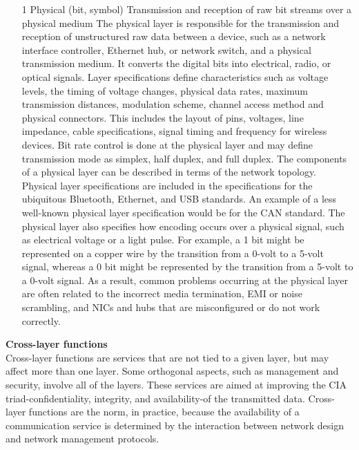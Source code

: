 \documentclass{article}
\begin{document}
\begin{enumerate}[label = \arabic*]
\item[1] Physical (bit, symbol) Transmission and reception of raw bit streams over a physical medium
	\subitem The physical layer is responsible for the transmission and reception of unstructured raw data between a device, such as a network interface controller, Ethernet hub, or network switch, and a physical transmission medium. It converts the digital bits into electrical, radio, or optical signals. Layer specifications define characteristics such as voltage levels, the timing of voltage changes, physical data rates, maximum transmission distances, modulation scheme, channel access method and physical connectors. This includes the layout of pins, voltages, line impedance, cable specifications, signal timing and frequency for wireless devices. Bit rate control is done at the physical layer and may define transmission mode as simplex, half duplex, and full duplex. The components of a physical layer can be described in terms of the network topology. Physical layer specifications are included in the specifications for the ubiquitous Bluetooth, Ethernet, and USB standards. An example of a less well-known physical layer specification would be for the CAN standard.
	\subitem The physical layer also specifies how encoding occurs over a physical signal, such as electrical voltage or a light pulse. For example, a 1 bit might be represented on a copper wire by the transition from a 0-volt to a 5-volt signal, whereas a 0 bit might be represented by the transition from a 5-volt to a 0-volt signal. As a result, common problems occurring at the physical layer are often related to the incorrect media termination, EMI or noise scrambling, and NICs and hubs that are misconfigured or do not work correctly. 
\end{enumerate}

\textbf{Cross-layer functions}\\
	
	Cross-layer functions are services that are not tied to a given layer, but may affect more than one layer. Some orthogonal aspects, such as management and security, involve all of the layers. These services are aimed at improving the CIA triad-confidentiality, integrity, and availability-of the transmitted data. Cross-layer functions are the norm, in practice, because the availability of a communication service is determined by the interaction between network design and network management protocols. 
\end{document}
